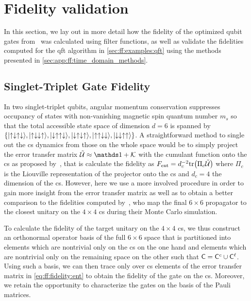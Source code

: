 \section{Fidelity validation}\label{sec:app:ff:fidelity}
In this section, we lay out in more detail how the fidelity of the optimized \sts qubit gates from~ was calculated using filter functions, as well as validate the fidelities computed for the \gls{qft} algorithm in \cref{sec:ff:examples:qft} using the methods presented in \cref{sec:app:ff:time_domain_methods}.
\subsection{Singlet-Triplet Gate Fidelity}\label{subsec:app:ff:fidelity:singlet-triplet}
In two singlet-triplet qubits, angular momentum conservation suppresses occupancy of states with non-vanishing magnetic spin quantum number $m_s$ so that the total accessible state space of dimension $d=6$ is spanned by $\lbrace\mbox{\ensuremath{\ket{\uparrow\downarrow\uparrow\downarrow}}},\mbox{\ensuremath{\ket{\uparrow\downarrow\downarrow\uparrow}}},\mbox{\ensuremath{\ket{\downarrow\uparrow\uparrow\downarrow}}},\mbox{\ensuremath{\ket{\downarrow\uparrow\downarrow\uparrow}}},\mbox{\ensuremath{\ket{\uparrow\uparrow\downarrow\downarrow}}},\mbox{\ensuremath{\ket{\downarrow\downarrow\uparrow\uparrow}}}\rbrace$.
A straightforward method to single out the \gls{cs} dynamics from those on the whole space would be to simply project the error transfer matrix $\liouvUe\approx\eye + \cumulantfun$ with \cumulantfun the cumulant function onto the \gls{cs} as proposed by~\citet{Wood2018}, that is calculate the fidelity as $F_{\mathrm{ent}} = d_c^{-2}\mathrm{tr}\bigl(\Pi_c\mathcal{\tilde{U}}\bigr)$ where $\Pi_c$ is the Liouville representation of the projector onto the \gls{cs} and $d_c = 4$ the dimension of the \gls{cs}.
However, here we use a more involved procedure in order to gain more insight from the error transfer matrix as well as to obtain a better comparison to the fidelities computed by~\citet{Cerfontaine2020}, who map the final $6\times 6$ propagator to the closest unitary on the $4\times 4$ \gls{cs} during their Monte Carlo simulation.

To calculate the fidelity of the target unitary on the $4\times 4$ \gls{cs}, we thus construct an orthonormal operator basis \basis of the full $6\times 6$ space that is partitioned into elements which are nontrivial only on the \gls{cs} on the one hand and elements which are nontrivial only on the remaining space on the other such that $\mathsf{C} = \mathsf{C}^c\cup\mathsf{C}^\ell$.
Using such a basis, we can then trace only over \gls{cs} elements of the error transfer matrix \liouvUe in \cref{eq:ff:fidelity:ent} to obtain the fidelity of the gate on the \gls{cs}.
Moreover, we retain the opportunity to characterize the gates on the basis of the Pauli matrices.

